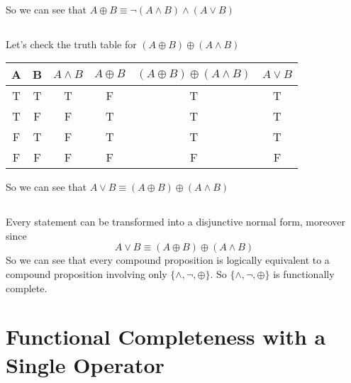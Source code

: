 \documentclass[a4paper,12pt,titlepage]{article}
\begin{document}
\paragraph{ }
So we can see that $A\oplus B\equiv \neg (A\wedge B)\wedge(A\vee B)$

\subsection{}
\paragraph{}
Let's check the truth table for $(A\oplus B)\oplus(A\wedge B)$ 

\begin{table}[H]
\newcommand{\tabincell}[2]{\begin{tabular}{@{}#1@{}}#2\end{tabular}}
  \centering
\begin{tabular}{|c|c|c|c|c|c|}
\hline
\hline
A & B & $A\wedge B$ & $A\oplus B$ & $(A\oplus B)\oplus(A\wedge B)$ &$A\vee B$\\
\hline
T & T & T & F & T & T \\
\hline
T & F & F & T & T & T \\
\hline
F & T & F & T & T & T \\
\hline
F & F & F & F & F & F \\
\hline
\hline
\end{tabular}
\end{table}

So we can see that $A\vee B\equiv (A\oplus B)\oplus(A\wedge B)$ 
\subsection{}
\paragraph{}
Every statement can be transformed into a disjunctive normal form, moreover since 
$$A\vee B\equiv (A\oplus B)\oplus(A\wedge B)$$
So we can see that every compound proposition is logically equivalent to a compound proposition involving only $\lbrace\wedge,\neg,\oplus\rbrace$. So $\lbrace\wedge,\neg,\oplus\rbrace$ is functionally complete.


\section{Functional Completeness with a Single Operator}
\end{document}
